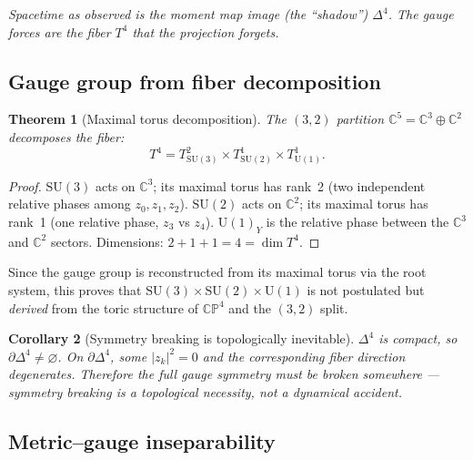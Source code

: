 \documentclass[12pt]{article}
\newtheorem{theorem}{Theorem}[section]
\newtheorem{corollary}[theorem]{Corollary}
\theoremstyle{remark}
\theoremstyle{definition}
\begin{document}
\noindent
\textit{Spacetime as observed is the moment map image (the ``shadow'') $\Delta^4$.  The gauge forces are the fiber $T^4$ that the projection forgets.}

\subsection{Gauge group from fiber decomposition}
\label{sec:toric_gauge}

\begin{theorem}[Maximal torus decomposition]
\label{thm:torus_decomposition}
The $(3,2)$ partition $\mathbb{C}^5 = \mathbb{C}^3 \oplus \mathbb{C}^2$ decomposes the fiber:
\begin{equation}
T^4 = T^2_{\mathrm{SU}(3)} \times T^1_{\mathrm{SU}(2)} \times T^1_{\mathrm{U}(1)}.
\end{equation}
\end{theorem}

\begin{proof}
$\mathrm{SU}(3)$ acts on $\mathbb{C}^3$; its maximal torus has rank~2 (two independent relative phases among $z_0, z_1, z_2$).  $\mathrm{SU}(2)$ acts on $\mathbb{C}^2$; its maximal torus has rank~1 (one relative phase, $z_3$ vs $z_4$).  $\mathrm{U}(1)_Y$ is the relative phase between the $\mathbb{C}^3$ and $\mathbb{C}^2$ sectors.  Dimensions: $2 + 1 + 1 = 4 = \dim T^4$.
\end{proof}

Since the gauge group is reconstructed from its maximal torus via the root system, this proves that $\mathrm{SU}(3) \times \mathrm{SU}(2) \times \mathrm{U}(1)$ is not postulated but \emph{derived} from the toric structure of $\mathbb{CP}^4$ and the $(3,2)$ split.

\begin{corollary}[Symmetry breaking is topologically inevitable]
\label{cor:breaking}
$\Delta^4$ is compact, so $\partial\Delta^4 \neq \varnothing$.  On $\partial\Delta^4$, some $|z_k|^2 = 0$ and the corresponding fiber direction degenerates.  Therefore the full gauge symmetry \emph{must} be broken somewhere --- symmetry breaking is a topological necessity, not a dynamical accident.
\end{corollary}

\subsection{Metric--gauge inseparability}
\label{sec:inseparability}
\end{document}
